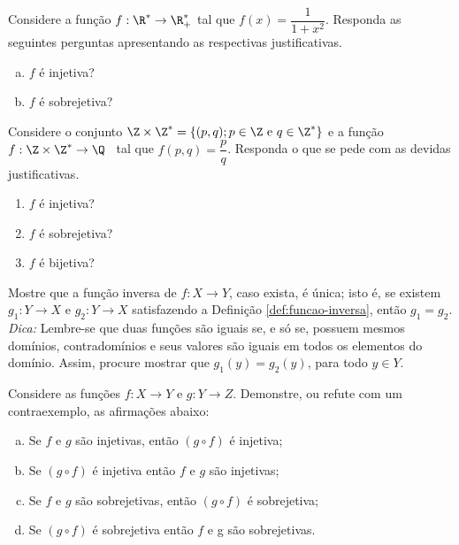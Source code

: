 \begin{exercise}
    Considere a função $f: \R^\ast \to \R^\ast_+$ tal que $f(x) = \dfrac{1}{1+x^2}$. Responda as seguintes perguntas apresentando as respectivas justificativas.
    \begin{enumerate}[a)]
        \item $f$ é injetiva?
	\item $f$ é sobrejetiva?
    \end{enumerate}
\end{exercise}

\begin{exercise}
	Considere o conjunto $\Z \times \Z^\ast = \left\{ (p, q) ; p \in \Z \text{ e } q \in \Z^\ast \right\}$ e a função \\ $f: \Z \times \Z^\ast \to \Q$ \ tal que $f(p,q) = \dfrac p q $. Responda o que se pede com as devidas justificativas.
\begin{enumerate}[label=(\alph*)]
\item $f$ é injetiva?
\item $f$ é sobrejetiva?
\item $f$ é bijetiva?
\end{enumerate}
\end{exercise}

\begin{exercise}
Mostre que a função inversa de $f: X \to Y$, caso exista, é
única; isto é, se existem $g_1 : Y \to X$ e $g_2 : Y \to X$
satisfazendo a Definição \ref{def:funcao-inversa}, então $g_1 = g_2$.\\
\emph{Dica: } Lembre-se que duas funções são iguais se, e só se,
possuem mesmos domínios, contradomínios e seus valores são iguais em
todos os elementos do domínio. Assim, procure mostrar que $g_1 (y) =
g_2 (y)$, para todo $y \in Y$.
\end{exercise}

\begin{exercise}
  Considere as funções $f: X \to Y$ e $g: Y \to Z$. Demonstre, ou refute com um contraexemplo, as afirmações abaixo:
\begin{enumerate}[(a)]
\item Se $f$ e $g$ são injetivas, então $(g \circ f)$ é injetiva;
\item Se $(g \circ f)$ é injetiva então $f$ e $g$ são injetivas;
\item Se $f$ e $g$ são sobrejetivas, então $(g \circ f)$ é sobrejetiva;
\item Se $(g \circ f)$ é sobrejetiva então $f$ e g são sobrejetivas.
\end{enumerate}
\end{exercise}

